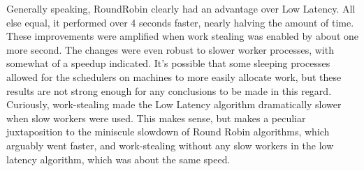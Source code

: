 \documentclass[letterpaper,twocolumn,10pt]{article}
\begin{document}
Generally speaking, RoundRobin clearly had an advantage over Low Latency. All
else equal, it performed over 4 seconds faster, nearly halving the amount of
time. These improvements were amplified when work stealing was enabled by about
one more second. The changes were even robust to slower worker processes, with
somewhat of a speedup indicated. It’s possible that some sleeping processes
allowed for the schedulers on machines to more easily allocate work, but these
results are not strong enough for any conclusions to be made in this regard.
Curiously, work-stealing made the Low Latency algorithm dramatically slower
when slow workers were used. This makes sense, but makes a peculiar
juxtaposition to the miniscule slowdown of Round Robin algorithms, which
arguably went faster, and work-stealing without any slow workers in the low
latency algorithm, which was about the same speed.
\end{document}
